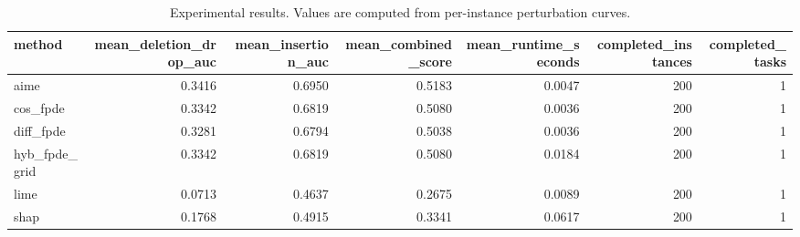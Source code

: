 \begin{table}[t]
\caption{Experimental results. Values are computed from per-instance perturbation curves.}
\label{tab:main_results_computed}
\centering
\begin{tabular}{lrrrrrr}
\toprule
method & mean\_deletion\_drop\_auc & mean\_insertion\_auc & mean\_combined\_score & mean\_runtime\_seconds & completed\_instances & completed\_tasks \\
\midrule
aime & 0.3416 & 0.6950 & 0.5183 & 0.0047 & 200 & 1 \\
cos\_fpde & 0.3342 & 0.6819 & 0.5080 & 0.0036 & 200 & 1 \\
diff\_fpde & 0.3281 & 0.6794 & 0.5038 & 0.0036 & 200 & 1 \\
hyb\_fpde\_grid & 0.3342 & 0.6819 & 0.5080 & 0.0184 & 200 & 1 \\
lime & 0.0713 & 0.4637 & 0.2675 & 0.0089 & 200 & 1 \\
shap & 0.1768 & 0.4915 & 0.3341 & 0.0617 & 200 & 1 \\
\bottomrule
\end{tabular}

\end{table}
